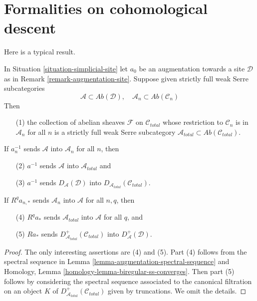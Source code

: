 \section{Formalities on cohomological descent}
\label{section-formal-cohomological-descent}

\noindent
Here is a typical result.

\begin{lemma}
\label{lemma-trivialities-cohomological-descent-abelian}
In Situation \ref{situation-simplicial-site} let $a_0$ be an augmentation
towards a site $\mathcal{D}$ as in Remark \ref{remark-augmentation-site}.
Suppose given strictly full weak Serre subcategories
$$
\mathcal{A} \subset \textit{Ab}(\mathcal{D}),\quad
\mathcal{A}_n \subset \textit{Ab}(\mathcal{C}_n)
$$
Then
\begin{enumerate}
\item[(1)]
the collection of abelian sheaves $\mathcal{F}$ on $\mathcal{C}_{total}$
whose restriction to $\mathcal{C}_n$ is in $\mathcal{A}_n$ for all $n$
is a strictly full weak Serre subcategory
$\mathcal{A}_{total} \subset \textit{Ab}(\mathcal{C}_{total})$.
\end{enumerate}
If $a_n^{-1}$ sends $\mathcal{A}$ into $\mathcal{A}_n$
for all $n$, then
\begin{enumerate}
\item[(2)] $a^{-1}$ sends $\mathcal{A}$ into $\mathcal{A}_{total}$ and
\item[(3)] $a^{-1}$ sends $D_\mathcal{A}(\mathcal{D})$ into
$D_{\mathcal{A}_{total}}(\mathcal{C}_{total})$.
\end{enumerate}
If $R^qa_{n, *}$ sends $\mathcal{A}_n$ into $\mathcal{A}$
for all $n, q$, then
\begin{enumerate}
\item[(4)] $R^qa_*$ sends $\mathcal{A}_{total}$ into $\mathcal{A}$ for all $q$,
and
\item[(5)] $Ra_*$ sends $D_{\mathcal{A}_{total}}^+(\mathcal{C}_{total})$
into $D_\mathcal{A}^+(\mathcal{D})$.
\end{enumerate}
\end{lemma}

\begin{proof}
The only interesting assertions are (4) and (5).
Part (4) follows from the spectral sequence in
Lemma \ref{lemma-augmentation-spectral-sequence}
and Homology, Lemma \ref{homology-lemma-biregular-ss-converges}.
Then part (5) follows by considering the spectral sequence
associated to the canonical filtration on an object
$K$ of $D_{\mathcal{A}_{total}}^+(\mathcal{C}_{total})$ given by truncations.
We omit the details.
\end{proof}

